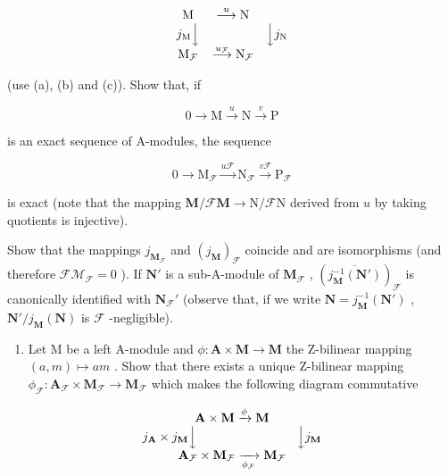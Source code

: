\[
\begin{array}{c c c} \mathrm{M} & \stackrel {{u}} {{\longrightarrow}} \mathrm{N} \\ j _ {\mathrm{M}} \Big \downarrow & & \Big \downarrow j _ {\mathrm{N}} \\ \mathrm{M} _ {\mathcal {F}} & \stackrel {{u _ {\mathcal {F}}}} {{\longrightarrow}} \mathrm{N} _ {\mathcal {F}} \end{array}
\]

(use (a), (b) and (c)). Show that, if

\[
0 \longrightarrow \mathrm{M} \stackrel {u} {\longrightarrow} \mathrm{N} \stackrel {v} {\longrightarrow} \mathrm{P}
\]

is an exact sequence of A-modules, the sequence

\[
0 \longrightarrow \mathrm{M} _ {\mathcal {F}} \stackrel {u \mathcal {F}} {\longrightarrow} \mathrm{N} _ {\mathcal {F}} \stackrel {v \mathcal {F}} {\longrightarrow} \mathrm{P} _ {\mathcal {F}}
\]

is exact (note that the mapping \(\mathbf{M} / \mathcal{F}\mathbf{M}\to \mathrm{N} / \mathcal{F}\mathrm{N}\) derived from \(u\) by taking quotients is injective).

Show that the mappings \(j_{\mathbf{M}_{\mathcal{F}}}\) and \((j_{\mathbf{M}})_{\mathcal{F}}\) coincide and are isomorphisms (and therefore \(\mathcal{FM}_{\mathcal{F}} = 0\) ). If \(\mathbf{N}'\) is a sub-A-module of \(\mathbf{M}_{\mathcal{F}}\) , \((\overline{j_{\mathbf{M}}^{-1}(\mathbf{N}')})_{\mathcal{F}}\) is canonically identified with \(\mathbf{N}_{\mathcal{F}}'\) (observe that, if we write \(\mathbf{N} = j_{\mathbf{M}}^{-1}(\mathbf{N}')\) , \(\mathbf{N}' / j_{\mathbf{M}}(\mathbf{N})\) is \(\mathcal{F}\) -negligible).

\begin{enumerate}
\def\labelenumi{(\alph{enumi})}
\setcounter{enumi}{4}
\tightlist
\item
  Let M be a left A-module and \(\phi: \mathbf{A} \times \mathbf{M} \to \mathbf{M}\) the Z-bilinear mapping \((a, m) \mapsto am\) . Show that there exists a unique Z-bilinear mapping \(\phi_{\mathcal{F}}: \mathbf{A}_{\mathcal{F}} \times \mathbf{M}_{\mathcal{F}} \to \mathbf{M}_{\mathcal{F}}\) which makes the following diagram commutative
\end{enumerate}

\[
\begin{array}{c} \mathbf {A} \times \mathbf {M} \xrightarrow {\phi} \mathbf {M} \\ j _ {\mathbf {A}} \times j _ {\mathbf {M}} \Big \downarrow \qquad \qquad \qquad \qquad \Big \downarrow j _ {\mathbf {M}} \\ \mathbf {A} _ {\mathcal {F}} \times \mathbf {M} _ {\mathcal {F}} \xrightarrow [ \phi_ {\mathcal {F}} ]{} \mathbf {M} _ {\mathcal {F}} \end{array}
\]

